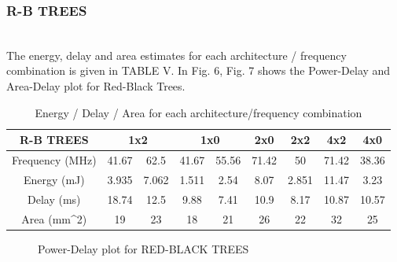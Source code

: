 
\subsubsection{R-B TREES}
\\
The energy, delay and area estimates for each architecture / frequency combination is given in TABLE V.
In Fig. 6, Fig. 7 shows the Power-Delay and Area-Delay plot for Red-Black Trees.

\begin{table}[h!]
\caption{Energy / Delay / Area for each architecture/frequency combination}
\begin{center}
{\begin{tabular}{ c |c  c  c  c   c   c    c   c}
\hline
R-B TREES &\multicolumn{2}{c}{1x2} &\multicolumn{2}{c}{1x0} &2x0 &2x2 &4x2 &4x0 \\ [1ex]
\hline
Frequency (MHz)& 41.67& 62.5& 41.67& 55.56& 71.42& 50 & 71.42&38.36\\[1ex]
Energy (mJ)&3.935 & 7.062 &1.511 &2.54 &8.07 &2.851 &11.47  &3.23 \\ [1ex]

Delay (ms)& 18.74 & 12.5& 9.88 & 7.41& 10.9& 8.17& 10.87& 10.57\\[1ex] 
Area (mm^2)& 19 & 23& 18 & 21& 26& 22& 32& 25\\[1ex]
\hline

\end{tabular}}
\label{diffstruc}
\end{center}
\end{table}


\begin{figure}[h!]
{\centering {} \par}
\caption{Power-Delay plot for RED-BLACK TREES}
\end{figure}

